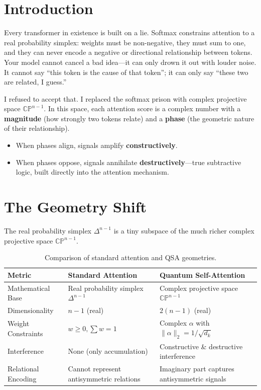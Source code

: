 \documentclass[11pt]{article}
\begin{document}
\tableofcontents
\newpage

\section{Introduction}

Every transformer in existence is built on a lie. Softmax constrains attention to a real probability simplex: weights must be non-negative, they must sum to one, and they can never encode a negative or directional relationship between tokens. Your model cannot cancel a bad idea---it can only drown it out with louder noise. It cannot say ``this token is the cause of that token''; it can only say ``these two are related, I guess.''

I refused to accept that. I replaced the softmax prison with complex projective space \(\mathbb{C}\mathbb{P}^{n-1}\). In this space, each attention score is a complex number with a \textbf{magnitude} (how strongly two tokens relate) and a \textbf{phase} (the geometric nature of their relationship).

\begin{itemize}
    \item When phases align, signals amplify \textbf{constructively}.
    \item When phases oppose, signals annihilate \textbf{destructively}---true subtractive logic, built directly into the attention mechanism.
\end{itemize}

\section{The Geometry Shift}

The real probability simplex \(\Delta^{n-1}\) is a tiny subspace of the much richer complex projective space \(\mathbb{C}\mathbb{P}^{n-1}\).

\begin{table}[htbp]
\centering
\begin{tabular}{@{}lll@{}}
\toprule
Metric & Standard Attention & Quantum Self-Attention \\
\midrule
Mathematical Base & Real probability simplex \(\Delta^{n-1}\) & Complex projective space \(\mathbb{C}\mathbb{P}^{n-1}\) \\
Dimensionality & \(n-1\) (real) & \(2(n-1)\) (real) \\
Weight Constraints & \(w \ge 0, \sum w = 1\) & Complex \(\alpha\) with \(\|\alpha\|_2 = 1/\sqrt{d_k}\) \\
Interference & None (only accumulation) & Constructive \& destructive interference \\
Relational Encoding & Cannot represent antisymmetric relations & Imaginary part captures antisymmetric signals \\
\bottomrule
\end{tabular}
\caption{Comparison of standard attention and QSA geometries.}
\label{tab:geometry}
\end{table}
\end{document}
